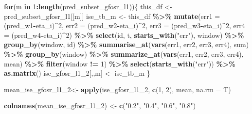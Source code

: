 \documentclass[
]{article}
\newenvironment{Shaded}{\begin{snugshade}}{\end{snugshade}}
\newcommand{\AttributeTok}[1]{\textcolor[rgb]{0.13,0.29,0.53}{#1}}
\newcommand{\ControlFlowTok}[1]{\textcolor[rgb]{0.13,0.29,0.53}{\textbf{#1}}}
\newcommand{\DecValTok}[1]{\textcolor[rgb]{0.00,0.00,0.81}{#1}}
\newcommand{\FunctionTok}[1]{\textcolor[rgb]{0.13,0.29,0.53}{\textbf{#1}}}
\newcommand{\NormalTok}[1]{#1}
\newcommand{\OtherTok}[1]{\textcolor[rgb]{0.56,0.35,0.01}{#1}}
\newcommand{\SpecialCharTok}[1]{\textcolor[rgb]{0.81,0.36,0.00}{\textbf{#1}}}
\newcommand{\StringTok}[1]{\textcolor[rgb]{0.31,0.60,0.02}{#1}}
\begin{document}
\begin{Shaded}
\begin{Highlighting}[]
\ControlFlowTok{for}\NormalTok{(m }\ControlFlowTok{in} \DecValTok{1}\SpecialCharTok{:}\FunctionTok{length}\NormalTok{(pred\_subset\_gfosr\_l1))\{}
\NormalTok{  this\_df }\OtherTok{\textless{}{-}}\NormalTok{ pred\_subset\_gfosr\_l1[[m]]}
\NormalTok{  ise\_tb\_m }\OtherTok{\textless{}{-}}\NormalTok{ this\_df }\SpecialCharTok{\%\textgreater{}\%}
    \FunctionTok{mutate}\NormalTok{(}\AttributeTok{err1 =}\NormalTok{ (pred\_w1}\SpecialCharTok{{-}}\NormalTok{eta\_i)}\SpecialCharTok{\^{}}\DecValTok{2}\NormalTok{,}
           \AttributeTok{err2 =}\NormalTok{ (pred\_w2}\SpecialCharTok{{-}}\NormalTok{eta\_i)}\SpecialCharTok{\^{}}\DecValTok{2}\NormalTok{,}
           \AttributeTok{err3 =}\NormalTok{ (pred\_w3}\SpecialCharTok{{-}}\NormalTok{eta\_i)}\SpecialCharTok{\^{}}\DecValTok{2}\NormalTok{,}
           \AttributeTok{err4 =}\NormalTok{ (pred\_w4}\SpecialCharTok{{-}}\NormalTok{eta\_i)}\SpecialCharTok{\^{}}\DecValTok{2}\NormalTok{) }\SpecialCharTok{\%\textgreater{}\%}
    \FunctionTok{select}\NormalTok{(id, t, }\FunctionTok{starts\_with}\NormalTok{(}\StringTok{"err"}\NormalTok{), window) }\SpecialCharTok{\%\textgreater{}\%} 
    \FunctionTok{group\_by}\NormalTok{(window, id) }\SpecialCharTok{\%\textgreater{}\%} 
    \FunctionTok{summarise\_at}\NormalTok{(}\FunctionTok{vars}\NormalTok{(err1, err2, err3, err4), sum) }\SpecialCharTok{\%\textgreater{}\%} 
    \FunctionTok{group\_by}\NormalTok{(window) }\SpecialCharTok{\%\textgreater{}\%} 
    \FunctionTok{summarize\_at}\NormalTok{(}\FunctionTok{vars}\NormalTok{(err1, err2, err3, err4), mean) }\SpecialCharTok{\%\textgreater{}\%}
    \FunctionTok{filter}\NormalTok{(window }\SpecialCharTok{!=} \DecValTok{1}\NormalTok{) }\SpecialCharTok{\%\textgreater{}\%} 
    \FunctionTok{select}\NormalTok{(}\FunctionTok{starts\_with}\NormalTok{(}\StringTok{"err"}\NormalTok{)) }\SpecialCharTok{\%\textgreater{}\%} \FunctionTok{as.matrix}\NormalTok{()}
\NormalTok{  ise\_gfosr\_l1\_2[,,m] }\OtherTok{\textless{}{-}}\NormalTok{ ise\_tb\_m}
\NormalTok{\}}

\NormalTok{mean\_ise\_gfosr\_l1\_2}\OtherTok{\textless{}{-}} \FunctionTok{apply}\NormalTok{(ise\_gfosr\_l1\_2, }\FunctionTok{c}\NormalTok{(}\DecValTok{1}\NormalTok{, }\DecValTok{2}\NormalTok{), mean, }\AttributeTok{na.rm =}\NormalTok{ T)}

\FunctionTok{colnames}\NormalTok{(mean\_ise\_gfosr\_l1\_2) }\OtherTok{\textless{}{-}} \FunctionTok{c}\NormalTok{(}\StringTok{"0.2"}\NormalTok{, }\StringTok{"0.4"}\NormalTok{, }\StringTok{"0.6"}\NormalTok{, }\StringTok{"0.8"}\NormalTok{)}
\end{Highlighting}
\end{Shaded}
\end{document}
